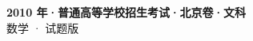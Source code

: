 \documentclass[zihao=-4, a4paper]{ctexart}
\begin{document}
\begin{center}
  {\Large\bfseries 2010 年·普通高等学校招生考试·北京卷·文科}\\[4pt]
  {\large 数学 · 试题版}
\end{center}
\medskip
{}

\end{document}
